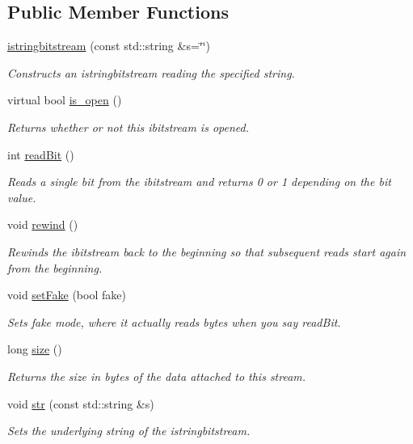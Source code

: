 \subsection*{Public Member Functions}
\begin{DoxyCompactItemize}
\item 
\mbox{\hyperlink{classistringbitstream_ae086e9a41bc91c4c64af792ff0aff81d}{istringbitstream}} (const std\+::string \&s=\char`\"{}\char`\"{})
\begin{DoxyCompactList}\small\item\em Constructs an istringbitstream reading the specified string. \end{DoxyCompactList}\item 
virtual bool \mbox{\hyperlink{classibitstream_a2f57f54d8c03b615bb31eee091d8a88a}{is\+\_\+open}} ()
\begin{DoxyCompactList}\small\item\em Returns whether or not this ibitstream is opened. \end{DoxyCompactList}\item 
int \mbox{\hyperlink{classibitstream_aa8c615fa7957fb0232a0873dadbd39e8}{read\+Bit}} ()
\begin{DoxyCompactList}\small\item\em Reads a single bit from the ibitstream and returns 0 or 1 depending on the bit value. \end{DoxyCompactList}\item 
void \mbox{\hyperlink{classibitstream_ab8734e666421c9fe3b6380a818c6c727}{rewind}} ()
\begin{DoxyCompactList}\small\item\em Rewinds the ibitstream back to the beginning so that subsequent reads start again from the beginning. \end{DoxyCompactList}\item 
void \mbox{\hyperlink{classibitstream_ad916b4624eb09d375514964f867b475c}{set\+Fake}} (bool fake)
\begin{DoxyCompactList}\small\item\em Sets \textquotesingle{}fake\textquotesingle{} mode, where it actually reads bytes when you say read\+Bit. \end{DoxyCompactList}\item 
long \mbox{\hyperlink{classibitstream_a22727e9c338fb1aaa6722031445373c3}{size}} ()
\begin{DoxyCompactList}\small\item\em Returns the size in bytes of the data attached to this stream. \end{DoxyCompactList}\item 
void \mbox{\hyperlink{classistringbitstream_a4a07e41ddf13ced3f7e3997886b48805}{str}} (const std\+::string \&s)
\begin{DoxyCompactList}\small\item\em Sets the underlying string of the istringbitstream. \end{DoxyCompactList}\end{DoxyCompactItemize}


